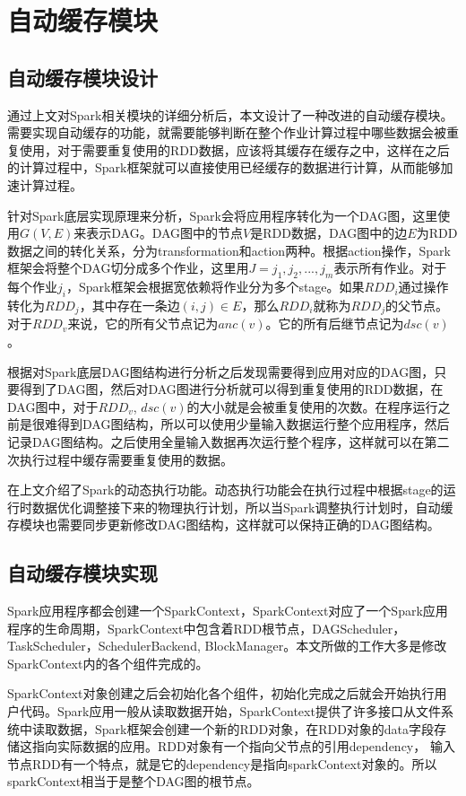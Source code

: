 \section{自动缓存模块}

\subsection{自动缓存模块设计}
通过上文对Spark相关模块的详细分析后，本文设计了一种改进的自动缓存模块。需要实现自动缓存的功能，就需要能够判断在整个作业计算过程中哪些数据会被重复使用，对于需要重复使用的RDD数据，应该将其缓存在缓存之中，这样在之后的计算过程中，Spark框架就可以直接使用已经缓存的数据进行计算，从而能够加速计算过程。

针对Spark底层实现原理来分析，Spark会将应用程序转化为一个DAG图，这里使用$G(V, E)$来表示DAG。DAG图中的节点$V$是RDD数据，DAG图中的边$E$为RDD数据之间的转化关系，分为transformation和action两种。根据action操作，Spark框架会将整个DAG切分成多个作业，这里用$J={j_1, j_2,...,j_m }$表示所有作业。对于每个作业$j_i$，Spark框架会根据宽依赖将作业分为多个stage。如果$RDD_i$通过操作转化为$RDD_j$，其中存在一条边$(i, j)\in E$，那么$RDD_i$就称为$RDD_j$的父节点。对于$RDD_v$来说，它的所有父节点记为$anc(v)$。它的所有后继节点记为$dsc(v)$。

根据对Spark底层DAG图结构进行分析之后发现需要得到应用对应的DAG图，只要得到了DAG图，然后对DAG图进行分析就可以得到重复使用的RDD数据，在DAG图中，对于$RDD_v$, $dsc(v)$的大小就是会被重复使用的次数。在程序运行之前是很难得到DAG图结构，所以可以使用少量输入数据运行整个应用程序，然后记录DAG图结构。之后使用全量输入数据再次运行整个程序，这样就可以在第二次执行过程中缓存需要重复使用的数据。

在上文介绍了Spark的动态执行功能。动态执行功能会在执行过程中根据stage的运行时数据优化调整接下来的物理执行计划，所以当Spark调整执行计划时，自动缓存模块也需要同步更新修改DAG图结构，这样就可以保持正确的DAG图结构。

\subsection{自动缓存模块实现}
Spark应用程序都会创建一个SparkContext，SparkContext对应了一个Spark应用程序的生命周期，SparkContext中包含着RDD根节点，DAGScheduler，TaskScheduler，SchedulerBackend, BlockManager。本文所做的工作大多是修改SparkContext内的各个组件完成的。

SparkContext对象创建之后会初始化各个组件，初始化完成之后就会开始执行用户代码。Spark应用一般从读取数据开始，SparkContext提供了许多接口从文件系统中读取数据，Spark框架会创建一个新的RDD对象，在RDD对象的data字段存储这指向实际数据的应用。RDD对象有一个指向父节点的引用dependency， 输入节点RDD有一个特点，就是它的dependency是指向sparkContext对象的。所以sparkContext相当于是整个DAG图的根节点。

